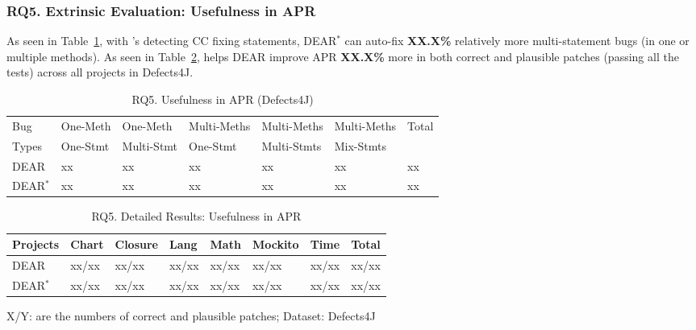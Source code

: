 \subsubsection{\bf RQ5. Extrinsic Evaluation: Usefulness in APR}
As seen in Table~\ref{RQ5_1}, with {\tool}'s detecting CC fixing
statements, DEAR$^{*}$ can auto-fix {\bf XX.X\%} relatively more
multi-statement bugs (in one or multiple methods). As seen in
Table~\ref{RQ5_2}, {\tool} helps DEAR improve APR {\bf XX.X\%} more in
both correct and plausible patches (passing all the tests) across all
projects in Defects4J.

\begin{table}[t]
	\caption{RQ5. Usefulness in APR (Defects4J)}
	\vspace{-12pt}
	\begin{center}
        \tabcolsep 2pt
		\footnotesize
		\renewcommand{\arraystretch}{1} 
		\begin{tabular}{p{0.7cm}<{\centering}|p{1.1cm}<{\centering}|p{1.1cm}<{\centering}|p{1.3cm}<{\centering}|p{1.3cm}<{\centering}|p{1.3cm}<{\centering}|p{0.7cm}<{\centering}}
			\hline
			Bug & One-Meth & One-Meth & Multi-Meths & Multi-Meths & Multi-Meths & Total\\
			Types          & One-Stmt & Multi-Stmt & One-Stmt & Multi-Stmts & Mix-Stmts & \\\hline
			DEAR & xx & xx & xx & xx & xx & xx\\
			DEAR$^{*}$ & xx & xx & xx & xx & xx & xx\\ 
			\hline
		\end{tabular}
		\label{RQ5_1}
	\end{center}
\vspace{-5pt}
\end{table}

\begin{table}[t]
	\caption{RQ5. Detailed Results: Usefulness in APR}
	\vspace{-10pt}
	\begin{center}
        \footnotesize
		\renewcommand{\arraystretch}{1} 
		\begin{tabular}{l|p{0.6cm}<{\centering}p{0.6cm}<{\centering}p{0.6cm}<{\centering}p{0.6cm}<{\centering}p{0.8cm}<{\centering}p{0.6cm}<{\centering}|p{0.5cm}<{\centering}}
			\hline
			Projects  & Chart & Closure & Lang & Math & Mockito & Time & Total\\
			\hline
			DEAR  & xx/xx  &  xx/xx     & xx/xx & xx/xx & xx/xx     & xx/xx  & xx/xx\\
		        DEAR$^{*}$ & xx/xx  &  xx/xx     & xx/xx & xx/xx & xx/xx     & xx/xx  & xx/xx\\
			\hline
		\end{tabular}
		
		{\footnotesize X/Y: are the numbers of correct and plausible patches; Dataset: Defects4J}
		\label{RQ5_2}
	\end{center}
\vspace{-5pt}
\end{table}
